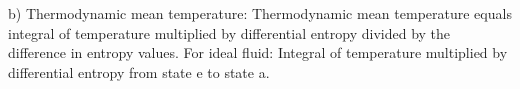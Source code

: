 b) Thermodynamic mean temperature:  
Thermodynamic mean temperature equals integral of temperature multiplied by differential entropy divided by the difference in entropy values.  
For ideal fluid:  
Integral of temperature multiplied by differential entropy from state e to state a.